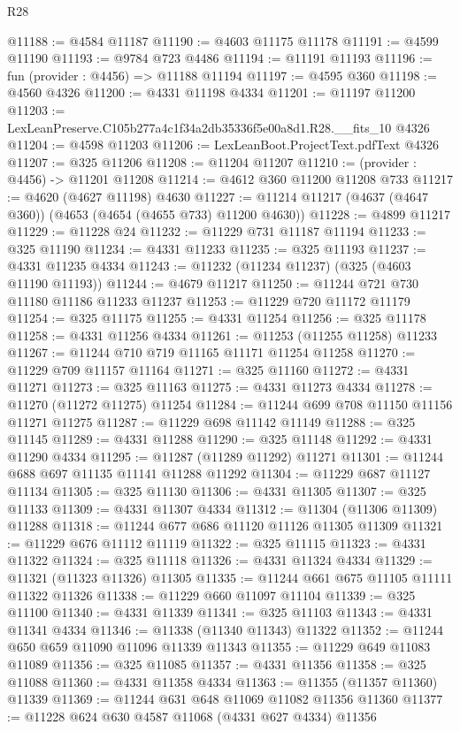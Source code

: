 \begin{lexlean}{R28}
\begin{coremodule}
@11188 := @4584 @11187
@11190 := @4603 @11175 @11178
@11191 := @4599 @11190
@11193 := @9784 @723 @4486
@11194 := @11191 @11193
@11196 := fun (provider : @4456) => @11188 @11194
@11197 := @4595 @360
@11198 := @4560 @4326
@11200 := @4331 @11198 @4334
@11201 := @11197 @11200
@11203 := LexLeanPreserve.C105b277a4c1f34a2db35336f5e00a8d1.R28.__fits_10 @4326
@11204 := @4598 @11203
@11206 := LexLeanBoot.ProjectText.pdfText @4326
@11207 := @325 @11206
@11208 := @11204 @11207
@11210 := (provider : @4456) -> @11201 @11208
@11214 := @4612 @360 @11200 @11208 @733
@11217 := @4620 (@4627 @11198) @4630
@11227 := @11214 @11217 (@4637 (@4647 @360)) (@4653 (@4654 (@4655 @733) @11200 @4630))
@11228 := @4899 @11217
@11229 := @11228 @24
@11232 := @11229 @731 @11187 @11194
@11233 := @325 @11190
@11234 := @4331 @11233
@11235 := @325 @11193
@11237 := @4331 @11235 @4334
@11243 := @11232 (@11234 @11237) (@325 (@4603 @11190 @11193))
@11244 := @4679 @11217
@11250 := @11244 @721 @730 @11180 @11186 @11233 @11237
@11253 := @11229 @720 @11172 @11179
@11254 := @325 @11175
@11255 := @4331 @11254
@11256 := @325 @11178
@11258 := @4331 @11256 @4334
@11261 := @11253 (@11255 @11258) @11233
@11267 := @11244 @710 @719 @11165 @11171 @11254 @11258
@11270 := @11229 @709 @11157 @11164
@11271 := @325 @11160
@11272 := @4331 @11271
@11273 := @325 @11163
@11275 := @4331 @11273 @4334
@11278 := @11270 (@11272 @11275) @11254
@11284 := @11244 @699 @708 @11150 @11156 @11271 @11275
@11287 := @11229 @698 @11142 @11149
@11288 := @325 @11145
@11289 := @4331 @11288
@11290 := @325 @11148
@11292 := @4331 @11290 @4334
@11295 := @11287 (@11289 @11292) @11271
@11301 := @11244 @688 @697 @11135 @11141 @11288 @11292
@11304 := @11229 @687 @11127 @11134
@11305 := @325 @11130
@11306 := @4331 @11305
@11307 := @325 @11133
@11309 := @4331 @11307 @4334
@11312 := @11304 (@11306 @11309) @11288
@11318 := @11244 @677 @686 @11120 @11126 @11305 @11309
@11321 := @11229 @676 @11112 @11119
@11322 := @325 @11115
@11323 := @4331 @11322
@11324 := @325 @11118
@11326 := @4331 @11324 @4334
@11329 := @11321 (@11323 @11326) @11305
@11335 := @11244 @661 @675 @11105 @11111 @11322 @11326
@11338 := @11229 @660 @11097 @11104
@11339 := @325 @11100
@11340 := @4331 @11339
@11341 := @325 @11103
@11343 := @4331 @11341 @4334
@11346 := @11338 (@11340 @11343) @11322
@11352 := @11244 @650 @659 @11090 @11096 @11339 @11343
@11355 := @11229 @649 @11083 @11089
@11356 := @325 @11085
@11357 := @4331 @11356
@11358 := @325 @11088
@11360 := @4331 @11358 @4334
@11363 := @11355 (@11357 @11360) @11339
@11369 := @11244 @631 @648 @11069 @11082 @11356 @11360
@11377 := @11228 @624 @630 @4587 @11068 (@4331 @627 @4334) @11356

\end{coremodule}
\end{lexlean}
